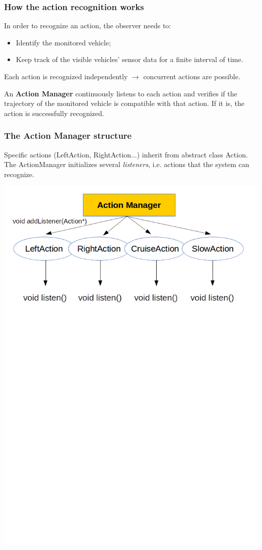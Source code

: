 \documentclass{beamer}
\begin{document}
\begin{frame}
\frametitle{How the action recognition works}
In order to recognize an action, the observer needs to:
\begin{itemize}
\item Identify the monitored vehicle;
\item Keep track of the visible vehicles' sensor data for a finite interval of time.
\end{itemize}

Each action is recognized independently $\rightarrow$ concurrent actions are possible.

\bigskip

An \textbf{Action Manager} continuously listens to each action and verifies if the trajectory of the monitored vehicle is compatible with that action. If it is, the action is successfully recognized.

\end{frame}

\begin{frame}
\frametitle{The Action Manager structure}
Specific actions (LeftAction, RightAction...) inherit from abstract class Action. The ActionManager initializes several \textit{listeners}, i.e. actions that the system can recognize.
\bigskip
\bigskip
\bigskip

\centering
\includegraphics[scale=0.5]{ActionManager}

\end{frame}
\end{document}
